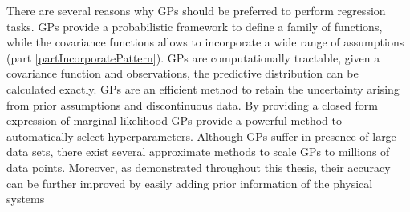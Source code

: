 There are several reasons why GPs should be preferred to perform regression tasks. GPs provide a probabilistic framework to define a family of functions, while the covariance functions allows to incorporate a wide range of assumptions (part \ref{partIncorporatePattern}). GPs are computationally tractable, given a covariance function and observations, the predictive distribution can be calculated exactly. GPs are an efficient method to retain the uncertainty arising from prior assumptions and discontinuous data. By providing a closed form expression of marginal likelihood GPs provide a powerful method to automatically select hyperparameters. Although GPs suffer in presence of large data sets, there exist several approximate methods to scale GPs to millions of data points. Moreover, as demonstrated throughout this thesis, their accuracy can be further improved by easily adding prior information of the physical systems